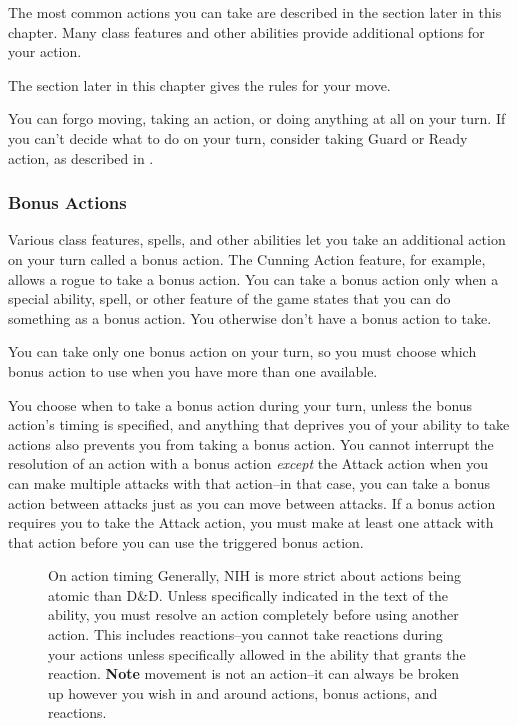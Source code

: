 The most common actions you can take are described in the  section later in this chapter. Many class features and other abilities provide additional options for your action.

The  section later in this chapter gives the rules for your move.

You can forgo moving, taking an action, or doing anything at all on your turn. If you can't decide what to do on your turn, consider taking Guard or Ready action, as described in .

\subsubsection{Bonus Actions}

Various class features, spells, and other abilities let you take an additional action on your turn called a bonus action. The Cunning Action feature, for example, allows a rogue to take a bonus action. You can take a bonus action only when a special ability, spell, or other feature of the game states that you can do something as a bonus action. You otherwise don't have a bonus action to take.

You can take only one bonus action on your turn, so you must choose which bonus action to use when you have more than one available.

You choose when to take a bonus action during your turn, unless the bonus action's timing is specified, and anything that deprives you of your ability to take actions also prevents you from taking a bonus action. You cannot interrupt the resolution of an action with a bonus action \textit{except} the Attack action when you can make multiple attacks with that action--in that case, you can take a bonus action between attacks just as you can move between attacks. If a bonus action requires you to take the Attack action, you must make at least one attack with that action before you can use the triggered bonus action.

\begin{figure}
    \begin{DndComment}{On action timing}
        Generally, NIH is more strict about actions being atomic than D\&D. Unless specifically indicated in the text of the ability, you must resolve an action completely before using another action. This includes reactions--you cannot take reactions during your actions unless specifically allowed in the ability that grants the reaction. \textbf{Note} movement is not an action--it can always be broken up however you wish in and around actions, bonus actions, and reactions.
    \end{DndComment}
\end{figure}

